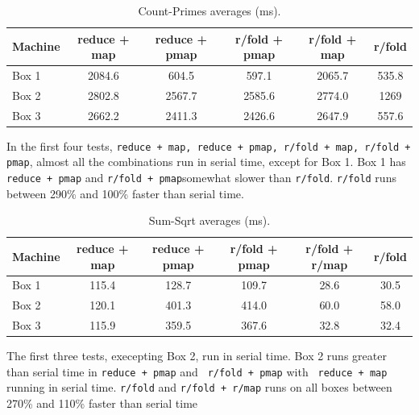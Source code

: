 \documentclass[12pt]{article}
\newcommand{\clocode}[1]{{\texttt {#1}}}
\begin{document}
\begin{table}[h!]
\begin{center}
\begin{tabular}{|l|c|c|c|c|c|}
\hline
Machine & reduce + map & reduce + pmap & r/fold + pmap & r/fold + map & r/fold\\
\hline
Box 1 & 2084.6 & 604.5 & 597.1 & 2065.7 & 535.8\\
Box 2 & 2802.8 & 2567.7 & 2585.6 & 2774.0 & 1269 \\
Box 3 & 2662.2 & 2411.3 & 2426.6 & 2647.9 & 557.6\\
\hline
\end{tabular}
\end{center}
\caption{Count-Primes averages (ms).}\label{table:sum-primes}
\end{table}

 In the first four tests, \clocode{reduce + map, reduce + pmap, r/fold + map, r/fold + pmap}, almost all the combinations run in serial time, except for Box 1. Box 1 has \clocode{reduce + pmap} and \clocode{r/fold + pmap}somewhat slower than \clocode{r/fold}. \clocode{r/fold} runs between 290\% and 100\% faster than serial time.


\begin{table}[h!]
\begin{center}
\begin{tabular}{|l|c|c|c|c|c|}
\hline
Machine & reduce + map & reduce + pmap & r/fold + pmap & r/fold + r/map & r/fold\\
\hline
Box 1 & 115.4 & 128.7 & 109.7 & 28.6 & 30.5\\
Box 2 & 120.1 & 401.3 & 414.0 & 60.0 & 58.0 \\
Box 3 & 115.9 & 359.5 & 367.6 & 32.8 & 32.4\\
\hline
\end{tabular}
\end{center}
\caption{Sum-Sqrt averages (ms).}\label{table:sum-primes}
\end{table}

The first three tests, execepting Box 2, run in serial time. Box 2 runs greater than serial time in \clocode{reduce + pmap} and \clocode{ r/fold + pmap} with \clocode{ reduce + map} running in serial time. \clocode{r/fold} and \clocode{r/fold + r/map} runs on all boxes between 270\% and 110\% faster than serial time
\end{document}
